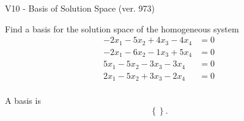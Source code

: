 \begin{exercise}
  \begin{exerciseTitle}V10 - Basis of Solution Space (ver. 973)\end{exerciseTitle}
  \begin{exerciseStatement}
    Find a basis for the solution space of the homogeneous system 
\begin{align*}
 -2 x_ 1 -5 x_ 2 + 4 x_ 3 -4 x_ 4 &= 0  \\ 
  -2 x_ 1 -6 x_ 2 -1 x_ 3 + 5 x_ 4 &= 0  \\ 
  5 x_ 1 -5 x_ 2 -3 x_ 3 -3 x_ 4 &= 0  \\ 
  2 x_ 1 -5 x_ 2 + 3 x_ 3 -2 x_ 4 &= 0  \\ 
 \end{align*}


 
  \end{exerciseStatement}

  \begin{exerciseAnswer}
   A basis is   
\[\left\{\right\}.\]

  


  \end{exerciseAnswer}
\end{exercise}